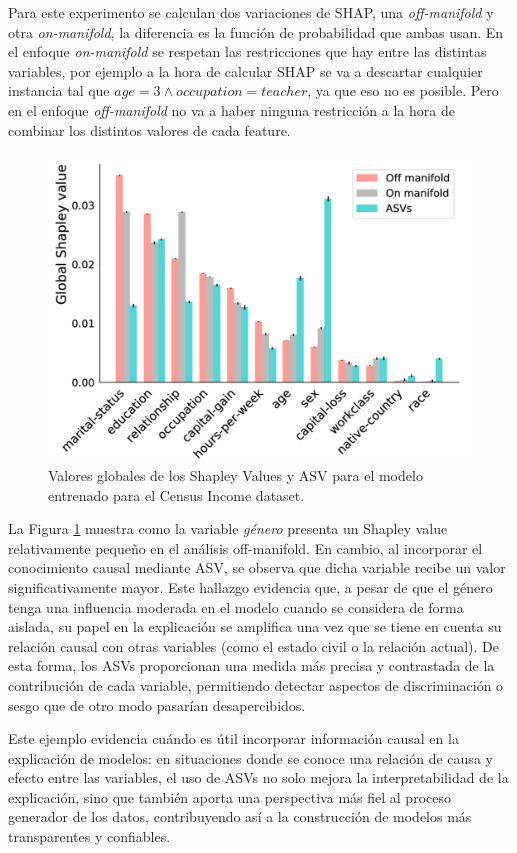 Para este experimento se calculan dos variaciones de SHAP, una \emph{off-manifold} y otra \emph{on-manifold}, la diferencia es la función de probabilidad que ambas usan. En el enfoque \emph{on-manifold} se respetan las restricciones que hay entre las distintas variables, por ejemplo a la hora de calcular SHAP se va a descartar cualquier instancia tal que $age=3 \land occupation = teacher$, ya que eso no es posible. Pero en el enfoque \emph{off-manifold} no va a haber ninguna restricción a la hora de combinar los distintos valores de cada feature. 

\begin{figure}
    \centering
    \includegraphics[width=0.5\linewidth]{img/asvPaperPlotExample.png}
    \caption{Valores globales de los Shapley Values y ASV para el modelo entrenado para el Census Income dataset.}
    \label{fig:asvPaperPlotExample}
\end{figure}

La Figura \ref{fig:asvPaperPlotExample} muestra como la variable \emph{género} presenta un Shapley value relativamente pequeño en el análisis off-manifold. En cambio, al incorporar el conocimiento causal mediante ASV, se observa que dicha variable recibe un valor significativamente mayor. Este hallazgo evidencia que, a pesar de que el género tenga una influencia moderada en el modelo cuando se considera de forma aislada, su papel en la explicación se amplifica una vez que se tiene en cuenta su relación causal con otras variables (como el estado civil o la relación actual). De esta forma, los ASVs proporcionan una medida más precisa y contrastada de la contribución de cada variable, permitiendo detectar aspectos de discriminación o sesgo que de otro modo pasarían desapercibidos.

Este ejemplo evidencia cuándo es útil incorporar información causal en la explicación de modelos: en situaciones donde se conoce una relación de causa y efecto entre las variables, el uso de ASVs no solo mejora la interpretabilidad de la explicación, sino que también aporta una perspectiva más fiel al proceso generador de los datos, contribuyendo así a la construcción de modelos más transparentes y confiables.

